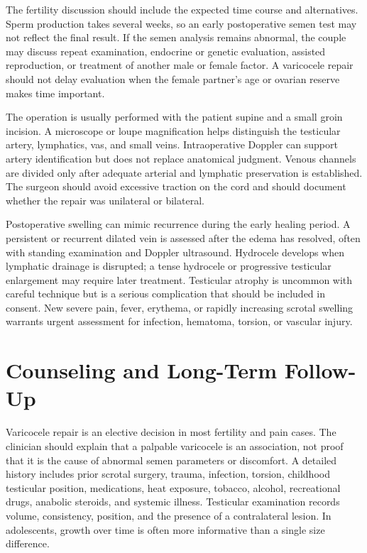 The fertility discussion should include the expected time course and alternatives. Sperm production takes several weeks, so an early postoperative semen test may not reflect the final result. If the semen analysis remains abnormal, the couple may discuss repeat examination, endocrine or genetic evaluation, assisted reproduction, or treatment of another male or female factor. A varicocele repair should not delay evaluation when the female partner's age or ovarian reserve makes time important.

The operation is usually performed with the patient supine and a small groin incision. A microscope or loupe magnification helps distinguish the testicular artery, lymphatics, vas, and small veins. Intraoperative Doppler can support artery identification but does not replace anatomical judgment. Venous channels are divided only after adequate arterial and lymphatic preservation is established. The surgeon should avoid excessive traction on the cord and should document whether the repair was unilateral or bilateral.

Postoperative swelling can mimic recurrence during the early healing period. A persistent or recurrent dilated vein is assessed after the edema has resolved, often with standing examination and Doppler ultrasound. Hydrocele develops when lymphatic drainage is disrupted; a tense hydrocele or progressive testicular enlargement may require later treatment. Testicular atrophy is uncommon with careful technique but is a serious complication that should be included in consent. New severe pain, fever, erythema, or rapidly increasing scrotal swelling warrants urgent assessment for infection, hematoma, torsion, or vascular injury.

\section*{Counseling and Long-Term Follow-Up}
Varicocele repair is an elective decision in most fertility and pain cases. The clinician should explain that a palpable varicocele is an association, not proof that it is the cause of abnormal semen parameters or discomfort. A detailed history includes prior scrotal surgery, trauma, infection, torsion, childhood testicular position, medications, heat exposure, tobacco, alcohol, recreational drugs, anabolic steroids, and systemic illness. Testicular examination records volume, consistency, position, and the presence of a contralateral lesion. In adolescents, growth over time is often more informative than a single size difference.

